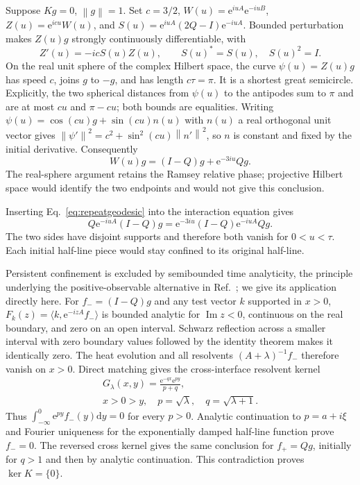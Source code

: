\documentclass[aps,pra,reprint,superscriptaddress,longbibliography]{revtex4-2}
\newcommand{\dd}{\mathrm d}
\newcommand{\ee}{\mathrm e}
\newcommand{\norm}[1]{\left\lVert#1\right\rVert}
\newcommand{\ip}[2]{\langle#1,#2\rangle}
\begin{document}
Suppose $Kg=0$, $\norm g=1$. Set $c=3/2$,
$W(u)=\ee^{iuA}\ee^{-iuB}$,
$Z(u)=\ee^{icu}W(u)$, and
$S(u)=\ee^{iuA}(2Q-I)\ee^{-iuA}$.
Bounded perturbation makes $Z(u)g$ strongly continuously
differentiable, with
\begin{equation}
 Z'(u)=-icS(u)Z(u),\qquad S(u)^*=S(u),\quad S(u)^2=I.
                                                        \label{eq:repeatcurve}
\end{equation}
On the real unit sphere of the complex Hilbert space, the curve
$\psi(u)=Z(u)g$ has speed $c$, joins $g$ to $-g$, and has length
$c\tau=\pi$. It is a shortest great semicircle. Explicitly, the
two spherical distances from $\psi(u)$ to the antipodes sum to
$\pi$ and are at most $cu$ and $\pi-cu$; both bounds are equalities.
Writing $\psi(u)=\cos(cu)g+\sin(cu)n(u)$ with $n(u)$ a real
orthogonal unit vector gives
$\norm{\psi'}^2=c^2+\sin^2(cu)\norm{n'}^2$, so $n$ is
constant and fixed by the initial derivative. Consequently
\begin{equation}
 W(u)g=(I-Q)g+\ee^{-3iu}Qg.                              \label{eq:repeatgeodesic}
\end{equation}
The real-sphere argument retains the Ramsey relative phase;
projective Hilbert space would identify the two endpoints and
would not give this conclusion.

Inserting Eq.~\eqref{eq:repeatgeodesic} into the interaction
equation gives
\begin{equation}
 Q\ee^{-iuA}(I-Q)g
       =\ee^{-3iu}(I-Q)\ee^{-iuA}Qg.                    \label{eq:repeatsupport}
\end{equation}
The two sides have disjoint supports and therefore both vanish
for $0<u<\tau$. Each initial half-line piece would stay confined
to its original half-line.

Persistent confinement is excluded by semibounded time analyticity,
the principle underlying the positive-observable alternative in
Ref.~\cite{Hegerfeldt1998}; we give its application directly here.
For $f_-=(I-Q)g$ and any test vector $k$ supported in $x>0$,
$F_k(z)=\ip{k}{\ee^{-izA}f_-}$ is bounded analytic for
$\operatorname{Im}z<0$, continuous on the real boundary, and
zero on an open interval. Schwarz reflection across a smaller
interval with zero boundary values followed by the identity
theorem makes it identically zero. The heat evolution and all
resolvents $(A+\lambda)^{-1}f_-$ therefore vanish on $x>0$.
Direct matching gives the cross-interface resolvent kernel
\begin{equation}
 \begin{gathered}
 G_\lambda(x,y)=\frac{\ee^{-qx}\ee^{py}}{p+q},\quad\\
 x>0>y,\quad p=\sqrt\lambda,\quad q=\sqrt{\lambda+1}.
                                                        \label{eq:repeatresolvent}
 \end{gathered}
\end{equation}
Thus $\int_{-\infty}^0\ee^{py}f_-(y)\dd y=0$ for every
$p>0$. Analytic continuation to $p=a+i\xi$ and Fourier
uniqueness for the exponentially damped half-line function
prove $f_-=0$. The reversed cross kernel gives the same conclusion
for $f_+=Qg$, initially for $q>1$ and then by analytic continuation.
This contradiction proves $\ker K=\{0\}$.
\end{document}
